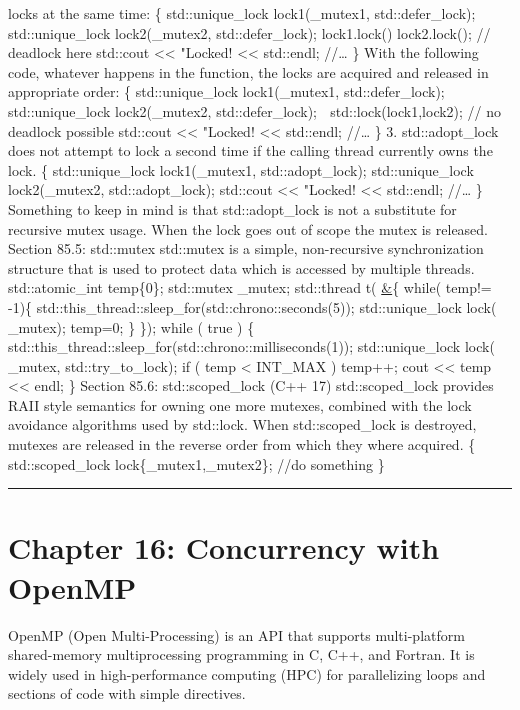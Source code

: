 locks at the same time: \{ std::unique\_lock lock1(\_mutex1,
std::defer\_lock); std::unique\_lock lock2(\_mutex2, std::defer\_lock);
lock1.lock() lock2.lock(); // deadlock here std::cout
\textless\textless{} "Locked! \textless\textless{} std::endl; //\ldots{}
\} With the following code, whatever happens in the function, the locks
are acquired and released in appropriate order: \{ std::unique\_lock
lock1(\_mutex1, std::defer\_lock); std::unique\_lock lock2(\_mutex2,
std::defer\_lock);  std::lock(lock1,lock2); // no deadlock possible
std::cout \textless\textless{} "Locked! \textless\textless{} std::endl;
//\ldots{} \} 3. std::adopt\_lock does not attempt to lock a second time
if the calling thread currently owns the lock. \{ std::unique\_lock
lock1(\_mutex1, std::adopt\_lock); std::unique\_lock lock2(\_mutex2,
std::adopt\_lock); std::cout \textless\textless{} "Locked!
\textless\textless{} std::endl; //\ldots{} \} Something to keep in mind
is that std::adopt\_lock is not a substitute for recursive mutex usage.
When the lock goes out of scope the mutex is released. Section 85.5:
std::mutex std::mutex is a simple, non-recursive synchronization
structure that is used to protect data which is accessed by multiple
threads. std::atomic\_int temp\{0\}; std::mutex \_mutex; std::thread t(
\href{}{\&}\{ while( temp!= -1)\{
std::this\_thread::sleep\_for(std::chrono::seconds(5));
std::unique\_lock lock( \_mutex); temp=0; \} \}); while ( true ) \{
std::this\_thread::sleep\_for(std::chrono::milliseconds(1));
std::unique\_lock lock( \_mutex, std::try\_to\_lock); if ( temp
\textless{} INT\_MAX ) temp++; cout \textless\textless{} temp
\textless\textless{} endl; \} Section 85.6: std::scoped\_lock (C++ 17)
std::scoped\_lock provides RAII style semantics for owning one more
mutexes, combined with the lock avoidance algorithms used by std::lock.
When std::scoped\_lock is destroyed, mutexes are released in the reverse
order from which they where acquired. \{ std::scoped\_lock
lock\{\_mutex1,\_mutex2\}; //do something \}

\begin{center}\rule{0.5\linewidth}{0.5pt}\end{center}

\hypertarget{chapter-16-concurrency-with-openmp}{%
\section{Chapter 16: Concurrency with
OpenMP}\label{chapter-16-concurrency-with-openmp}}

OpenMP (Open Multi-Processing) is an API that supports multi-platform
shared-memory multiprocessing programming in C, C++, and Fortran. It is
widely used in high-performance computing (HPC) for parallelizing loops
and sections of code with simple directives.

